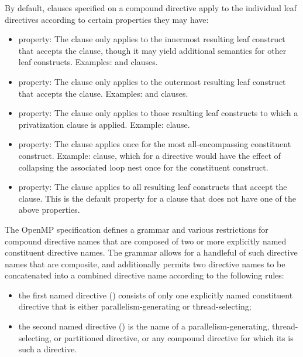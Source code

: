 By default, clauses specified on a compound directive apply to the
individual leaf directives according to certain properties they may have:
\begin{itemize}
\item {} property: The clause only applies to the innermost
      resulting leaf construct that accepts the clause, though it may yield
      additional semantics for other leaf constructs. Examples:
       and  clauses.
\item {} property: The clause only applies to the outermost
      resulting leaf construct that accepts the clause. Examples:
       and  clauses.
\item {} property: The clause only applies to those
      resulting leaf constructs to which a privatization clause is applied.
      Example:  clause.
\item {} property: The clause applies once for the
      most all-encompassing constituent construct. Example: 
      clause, which for a  directive would
      have the effect of collapsing the associated loop nest once for the
       constituent construct.
\item {} property: The clause applies to all
      resulting leaf constructs that accept the clause. This is the default
      property for a clause that does not have one of the above properties.
\end{itemize}

The OpenMP specification defines a grammar and various restrictions for
compound directive names that are composed of two or more explicitly named
constituent directive names. The grammar allows for a handleful of such
directive names that are composite, and additionally permits two directive
names to be concatenated into a combined directive name according to the
following rules:

\begin{itemize}
\item the first named directive () consists of only one
      explicitly named constituent directive that is either
      parallelism-generating or thread-selecting;
\item the second named directive () is the name of a
      parallelism-generating, thread-selecting, or partitioned directive, or any
      compound directive for which its  is such a
      directive.
\end{itemize}

